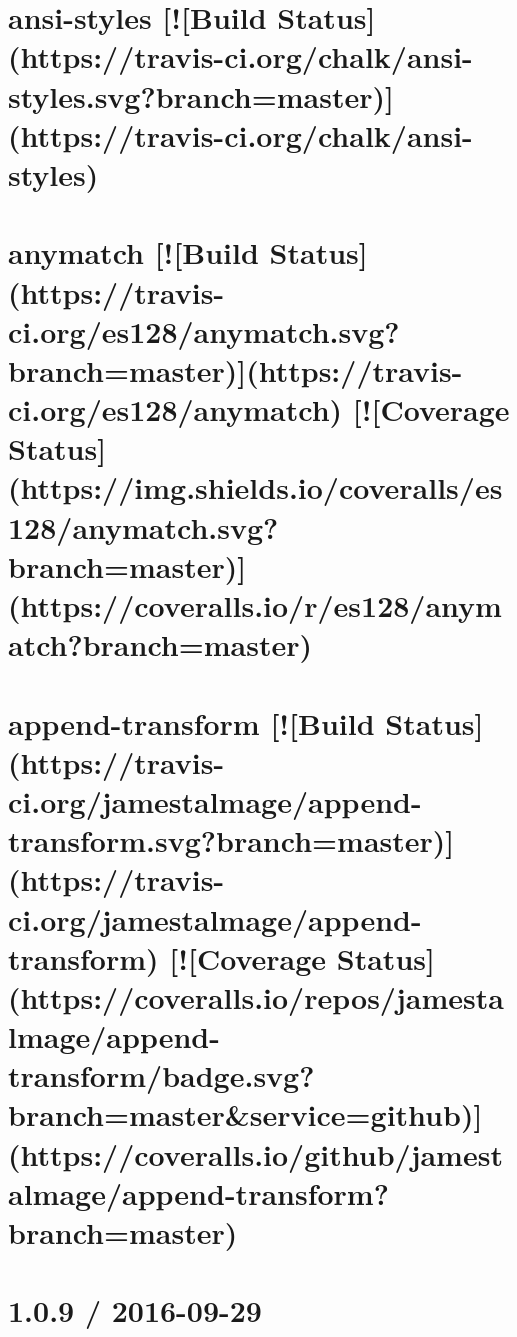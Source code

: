 \documentclass[twoside]{book}
\newcommand{\+}{\discretionary{\mbox{\scriptsize$\hookleftarrow$}}{}{}}
\begin{document}
\chapter{ansi-\/styles \mbox{[}!\mbox{[}Build Status\mbox{]}(https\+://travis-\/ci.org/chalk/ansi-\/styles.svg?branch=master)\mbox{]}(https\+://travis-\/ci.org/chalk/ansi-\/styles)}
\label{md__c_1_workspace_demo_src_main_script_node_modules_ansi-styles_readme}

\chapter{anymatch \mbox{[}!\mbox{[}Build Status\mbox{]}(https\+://travis-\/ci.org/es128/anymatch.svg?branch=master)\mbox{]}(https\+://travis-\/ci.org/es128/anymatch) \mbox{[}!\mbox{[}Coverage Status\mbox{]}(https\+://img.shields.\+io/coveralls/es128/anymatch.svg?branch=master)\mbox{]}(https\+://coveralls.io/r/es128/anymatch?branch=master)}
\label{md__c_1_workspace_demo_src_main_script_node_modules_anymatch__r_e_a_d_m_e}

\chapter{append-\/transform \mbox{[}!\mbox{[}Build Status\mbox{]}(https\+://travis-\/ci.org/jamestalmage/append-\/transform.svg?branch=master)\mbox{]}(https\+://travis-\/ci.org/jamestalmage/append-\/transform) \mbox{[}!\mbox{[}Coverage Status\mbox{]}(https\+://coveralls.io/repos/jamestalmage/append-\/transform/badge.svg?branch=master\&service=github)\mbox{]}(https\+://coveralls.io/github/jamestalmage/append-\/transform?branch=master)}
\label{md__c_1_workspace_demo_src_main_script_node_modules_append-transform_readme}

\chapter{1.0.9 / 2016-\/09-\/29}
\label{md__c_1_workspace_demo_src_main_script_node_modules_argparse__c_h_a_n_g_e_l_o_g}

\end{document}
